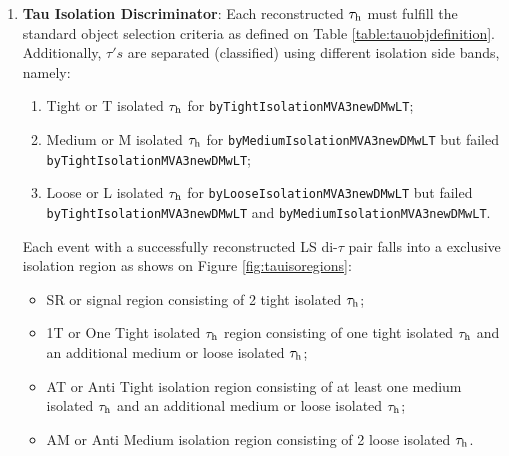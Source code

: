 \begin{enumerate}
	\item \textbf{Tau Isolation Discriminator}: Each reconstructed $\tau_{\text{h}}$ must fulfill the standard object selection criteria as defined on Table \ref{table:tauobjdefinition}. Additionally, $\tau's$ are separated (classified) using different isolation side bands, namely:
	
	\begin{enumerate}
		\item Tight or T isolated $\tau_{\text{h}}$ for \texttt{byTight\-IsolationMVA3newDMwLT};
		\item Medium or M isolated $\tau_{\text{h}}$ for \texttt{byMedium\-IsolationMVA3newDMwLT} but failed \texttt{byTight\-IsolationMVA3newDMwLT};
		\item Loose or L isolated $\tau_{\text{h}}$  for \texttt{byLoose\-IsolationMVA3newDMwLT} but failed \texttt{byTight\-IsolationMVA3newDMwLT} and \texttt{byMedium\-IsolationMVA3newDMwLT}.
	\end{enumerate}
	Each event with a successfully reconstructed LS di-$\tau$ pair falls into a exclusive isolation region as shows on Figure \ref{fig:tauisoregions}:
	
	\begin{itemize}
		\item SR or signal region consisting of 2 tight isolated $\tau_{\text{h}}$;
		\item 1T or One Tight isolated $\tau_{\text{h}}$ region consisting of one tight isolated $\tau_{\text{h}}$ and an additional medium or loose isolated $\tau_{\text{h}}$;
		\item AT or Anti Tight isolation region consisting of at least one medium isolated $\tau_{\text{h}}$ and an additional medium or loose isolated $\tau_{\text{h}}$;
		\item AM or Anti Medium isolation region consisting of 2 loose isolated $\tau_{\text{h}}$.
	\end{itemize}
	

\end{enumerate}
